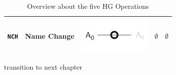 \begin{table}[H]
\begin{center}
\begin{tabular}{m{0.75cm} m{2.5cm} m{2.5cm} m{2.0cm} m{2.5cm}}
  \midrule
  \texttt{NCH} & Name Change & \raisebox{-0.25\height}
  {\includegraphics{graphics/concept/operations/NCH}} &
  $ \emptyset $ &
  $ \emptyset $ \\

  \bottomrule
\end{tabular}
\caption{Overview about the five HG Operations}
\label{tab:historical_geographic_operations}
\end{center}
\end{table}







\vspace{2em}
transition to next chapter

